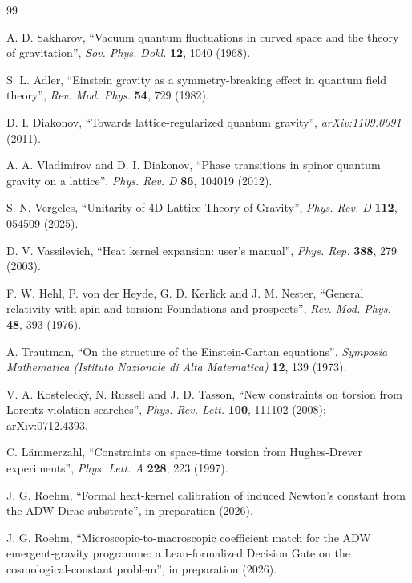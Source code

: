 \documentclass[twocolumn]{revtex4-2}
\begin{document}
\begin{thebibliography}{99}

A. D. Sakharov, ``Vacuum quantum fluctuations in curved space and the
theory of gravitation'', \emph{Sov. Phys. Dokl.} \textbf{12},
1040 (1968).

S. L. Adler, ``Einstein gravity as a symmetry-breaking effect in
quantum field theory'', \emph{Rev. Mod. Phys.} \textbf{54}, 729
(1982).

D. I. Diakonov, ``Towards lattice-regularized quantum gravity'',
\emph{arXiv:1109.0091} (2011).

A. A. Vladimirov and D. I. Diakonov, ``Phase transitions in spinor
quantum gravity on a lattice'', \emph{Phys. Rev. D} \textbf{86},
104019 (2012).

S. N. Vergeles, ``Unitarity of 4D Lattice Theory of Gravity'',
\emph{Phys. Rev. D} \textbf{112}, 054509 (2025).

D. V. Vassilevich, ``Heat kernel expansion: user's manual'',
\emph{Phys. Rep.} \textbf{388}, 279 (2003).

F. W. Hehl, P. von der Heyde, G. D. Kerlick and J. M. Nester,
``General relativity with spin and torsion: Foundations and
prospects'', \emph{Rev. Mod. Phys.} \textbf{48}, 393 (1976).

A. Trautman, ``On the structure of the Einstein-Cartan equations'',
\emph{Symposia Mathematica (Istituto Nazionale di Alta Matematica)}
\textbf{12}, 139 (1973).

V. A. Kostelecký, N. Russell and J. D. Tasson, ``New constraints on
torsion from Lorentz-violation searches'', \emph{Phys. Rev. Lett.}
\textbf{100}, 111102 (2008); arXiv:0712.4393.

C. Lämmerzahl, ``Constraints on space-time torsion from Hughes-Drever
experiments'', \emph{Phys. Lett. A} \textbf{228}, 223 (1997).

J. G. Roehm, ``Formal heat-kernel calibration of induced Newton's
constant from the ADW Dirac substrate'', in preparation (2026).

J. G. Roehm, ``Microscopic-to-macroscopic coefficient match for the
ADW emergent-gravity programme: a Lean-formalized Decision Gate on
the cosmological-constant problem'', in preparation (2026).

\end{thebibliography}
\end{document}
